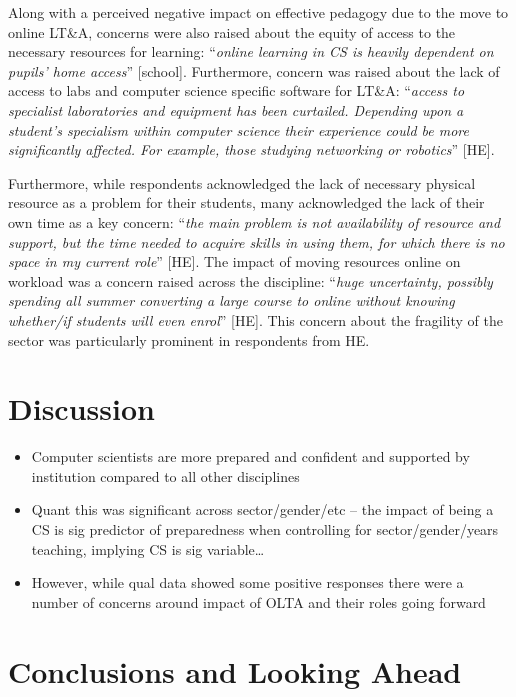 \documentclass[sigconf]{acmart}
\begin{document}
Along with a perceived negative impact on effective pedagogy due to
the move to online LT\&A, concerns were also raised about the equity
of access to the necessary resources for learning: ``{\emph{online learning in
CS is heavily dependent on pupils' home access}}'' [school]. Furthermore,
concern was raised about the lack of access to labs and computer
science specific software for LT\&A: ``{\emph{access to specialist
laboratories and equipment has been curtailed. Depending upon a
student’s specialism within computer science their experience could be
more significantly affected. For example, those studying networking or
robotics}}'' [HE].

Furthermore, while respondents acknowledged the lack of necessary
physical resource as a problem for their students, many acknowledged
the lack of their own time as a key concern: ``{\emph{the main problem
is not availability of resource and support, but the time needed to
acquire skills in using them, for which there is no space in my
current role}}'' [HE]. The impact of moving resources online on
workload was a concern raised across the discipline: ``{\emph{huge
uncertainty, possibly spending all summer converting a large course to
online without knowing whether/if students will even enrol}}''
[HE]. This concern about the fragility of the sector was particularly
prominent in respondents from HE.

\section{Discussion}\label{discussion}

\begin{itemize}
\item Computer scientists are more prepared and confident and
supported by institution compared to all other disciplines
\item Quant this was significant across sector/gender/etc – the impact
of being a CS is sig predictor of preparedness when controlling for
sector/gender/years teaching, implying CS is sig variable…
\item However, while qual data showed some positive responses there
were a number of concerns around impact of OLTA and their roles going
forward
\end{itemize}

\section{Conclusions and Looking Ahead}\label{conclusions}
\end{document}
